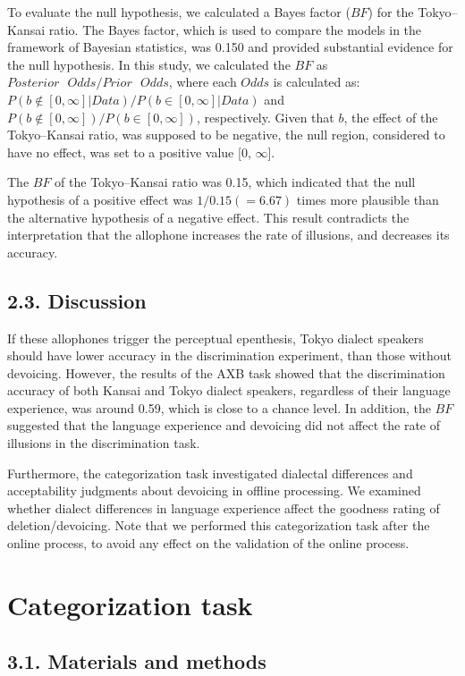 \documentclass[a4paper,11pt,twocolumn]{article}
\begin{document}
To evaluate the null hypothesis, we calculated a Bayes factor ($BF$) for the Tokyo--Kansai ratio. The Bayes factor, which is used to compare the models in the framework of Bayesian statistics, was 0.150 and provided substantial evidence for the null hypothesis. In this study, we calculated the $BF$ as $Posterior \text{ }Odds / Prior \text{ }Odds$, where each $Odds$ is calculated as: $P(b\notin[0, \infty] | Data)/P(b\in[0, \infty] | Data)$ and $P(b\notin[0, \infty])/P(b\in[0, \infty])$, respectively. Given that $b$, the effect of the Tokyo--Kansai ratio, was supposed to be negative, the null region\cite{kruschke2010believe}, considered to have no effect, was set to a positive value [0, $\infty$].

The $BF$ of the Tokyo--Kansai ratio was 0.15, which indicated that the null hypothesis of a positive effect was $1/0.15(=6.67)$ times more plausible than the alternative hypothesis of a negative effect. This result contradicts the interpretation that the allophone increases the rate of illusions, and decreases its accuracy.

\subsection{2.3. Discussion}

If these allophones trigger the perceptual epenthesis, Tokyo dialect speakers should have lower accuracy in the discrimination experiment, than those without devoicing. However, the results of the AXB task showed that the discrimination accuracy of both Kansai and Tokyo dialect speakers, regardless of their language experience, was around 0.59, which is close to a chance level. In addition, the $BF$ suggested that the language experience and devoicing did not affect the rate of illusions in the discrimination task.

Furthermore, the categorization task investigated dialectal differences and acceptability judgments about devoicing in offline processing. We examined whether dialect differences in language experience affect the goodness rating of deletion/devoicing. Note that we performed this categorization task after the online process, to avoid any effect on the validation of the online process.

\section{Categorization task}

\subsection{3.1. Materials and methods}
\end{document}
